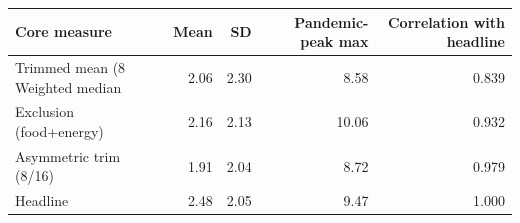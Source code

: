 \begin{tabular}{lrrrr}
\toprule
Core measure & Mean & SD & Pandemic-peak max & Correlation with headline \\
\midrule
Trimmed mean (8%
Weighted median & 2.06 & 2.30 & 8.58 & 0.839 \\
Exclusion (food+energy) & 2.16 & 2.13 & 10.06 & 0.932 \\
Asymmetric trim (8/16) & 1.91 & 2.04 & 8.72 & 0.979 \\
\midrule
Headline & 2.48 & 2.05 & 9.47 & 1.000 \\
\bottomrule
\end{tabular}
